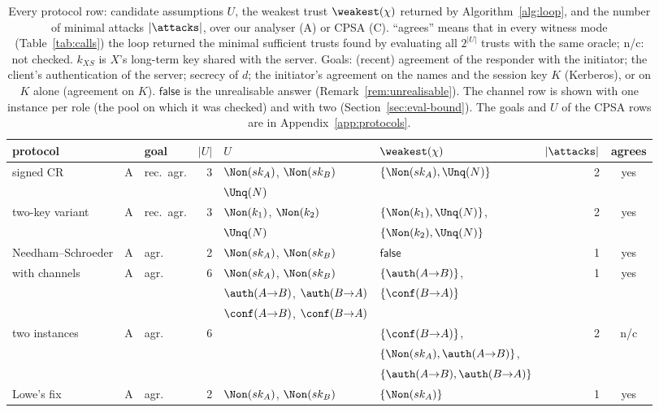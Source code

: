\begin{table}[tbp]
\caption{Every protocol row: candidate assumptions $U$, the weakest trust $\weakest(\chi)$ returned by Algorithm~\ref{alg:loop}, and the number of minimal attacks $|\attacks|$, over our analyser (A) or CPSA (C). ``agrees'' means that in every witness mode (Table~\ref{tab:calls}) the loop returned the minimal sufficient trusts found by evaluating all $2^{|U|}$ trusts with the same oracle; n/c: not checked. $k_{XS}$ is $X$'s long-term key shared with the server. Goals: (recent) agreement of the responder with the initiator; the client's authentication of the server; secrecy of $d$; the initiator's agreement on the names and the session key $K$ (Kerberos), or on $K$ alone (agreement on $K$). $\mathsf{false}$ is the unrealisable answer (Remark~\ref{rem:unrealisable}). The channel row is shown with one instance per role (the pool on which it was checked) and with two (Section~\ref{sec:eval-bound}). The goals and $U$ of the CPSA rows are in Appendix~\ref{app:protocols}.}
\label{tab:results}
\centering
\setlength{\tabcolsep}{2.5pt}
\footnotesize
\begin{tabular}{l c l r l l r c}
\toprule
protocol & & goal & $|U|$ & $U$ & $\weakest(\chi)$ & $|\attacks|$ & agrees\\
\midrule
signed CR & A & rec.\ agr. & 3 & $\Non(sk_A)$, $\Non(sk_B)$ & $\{\Non(sk_A), \Unq(N)\}$ & 2 & yes\\
 & & & & $\Unq(N)$ &  & & \\
\quad two-key variant & A & rec.\ agr. & 3 & $\Non(k_1)$, $\Non(k_2)$ & $\{\Non(k_1), \Unq(N)\}$, & 2 & yes\\
 & & & & $\Unq(N)$ & $\{\Non(k_2), \Unq(N)\}$ & & \\
Needham--Schroeder & A & agr. & 2 & $\Non(sk_A)$, $\Non(sk_B)$ & $\mathsf{false}$ & 1 & yes\\
\quad with channels & A & agr. & 6 & $\Non(sk_A)$, $\Non(sk_B)$ & $\{\auth(A{\to}B)\}$, & 1 & yes\\
 & & & & $\auth(A{\to}B)$, $\auth(B{\to}A)$ & $\{\conf(B{\to}A)\}$ & & \\
 & & & & $\conf(A{\to}B)$, $\conf(B{\to}A)$ &  & & \\
\quad\quad two instances & A & agr. & 6 & & $\{\conf(B{\to}A)\}$, & 2 & n/c\\
 & & & & & $\{\Non(sk_A), \auth(A{\to}B)\}$, & & \\
 & & & & & $\{\auth(A{\to}B), \auth(B{\to}A)\}$ & & \\
\quad Lowe's fix & A & agr. & 2 & $\Non(sk_A)$, $\Non(sk_B)$ & $\{\Non(sk_A)\}$ & 1 & yes\\

\end{tabular}
\end{table}
